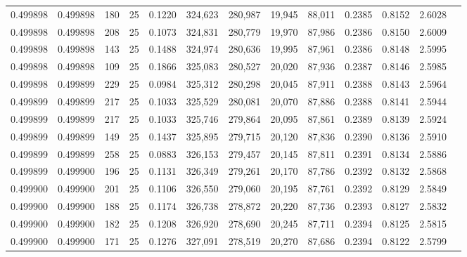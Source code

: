 \begin{tabular}{rrrrrrrrrrrrr}
0.499898 & 0.499898 &   180 &  25 &                                     0.1220 & 324,623 & 280,987 &  19,945 &  88,011 & 0.2385 & 0.8152 & 2.6028 \\
0.499898 & 0.499898 &   208 &  25 &                                     0.1073 & 324,831 & 280,779 &  19,970 &  87,986 & 0.2386 & 0.8150 & 2.6009 \\
0.499898 & 0.499898 &   143 &  25 &                                     0.1488 & 324,974 & 280,636 &  19,995 &  87,961 & 0.2386 & 0.8148 & 2.5995 \\
0.499898 & 0.499898 &   109 &  25 &                                     0.1866 & 325,083 & 280,527 &  20,020 &  87,936 & 0.2387 & 0.8146 & 2.5985 \\
0.499898 & 0.499899 &   229 &  25 &                                     0.0984 & 325,312 & 280,298 &  20,045 &  87,911 & 0.2388 & 0.8143 & 2.5964 \\
0.499899 & 0.499899 &   217 &  25 &                                     0.1033 & 325,529 & 280,081 &  20,070 &  87,886 & 0.2388 & 0.8141 & 2.5944 \\
0.499899 & 0.499899 &   217 &  25 &                                     0.1033 & 325,746 & 279,864 &  20,095 &  87,861 & 0.2389 & 0.8139 & 2.5924 \\
0.499899 & 0.499899 &   149 &  25 &                                     0.1437 & 325,895 & 279,715 &  20,120 &  87,836 & 0.2390 & 0.8136 & 2.5910 \\
0.499899 & 0.499899 &   258 &  25 &                                     0.0883 & 326,153 & 279,457 &  20,145 &  87,811 & 0.2391 & 0.8134 & 2.5886 \\
0.499899 & 0.499900 &   196 &  25 &                                     0.1131 & 326,349 & 279,261 &  20,170 &  87,786 & 0.2392 & 0.8132 & 2.5868 \\
0.499900 & 0.499900 &   201 &  25 &                                     0.1106 & 326,550 & 279,060 &  20,195 &  87,761 & 0.2392 & 0.8129 & 2.5849 \\
0.499900 & 0.499900 &   188 &  25 &                                     0.1174 & 326,738 & 278,872 &  20,220 &  87,736 & 0.2393 & 0.8127 & 2.5832 \\
0.499900 & 0.499900 &   182 &  25 &                                     0.1208 & 326,920 & 278,690 &  20,245 &  87,711 & 0.2394 & 0.8125 & 2.5815 \\
0.499900 & 0.499900 &   171 &  25 &                                     0.1276 & 327,091 & 278,519 &  20,270 &  87,686 & 0.2394 & 0.8122 & 2.5799 \\

\end{tabular}
